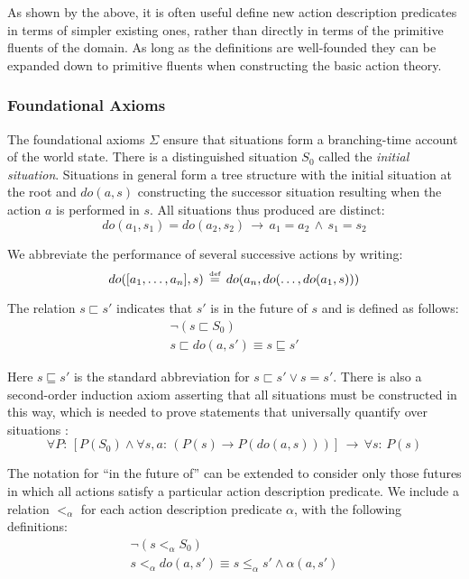 As shown by the above, it is often useful define new action description
predicates in terms of simpler existing ones, rather than directly
in terms of the primitive fluents of the domain. As long as the definitions
are well-founded they can be expanded down to primitive fluents when
constructing the basic action theory.


\subsubsection{Foundational Axioms}

The foundational axioms $\Sigma$ ensure that situations form a branching-time
account of the world state. There is a distinguished situation $S_{0}$
called the \emph{initial situation}. Situations in general form a
tree structure with the initial situation at the root and $do(a,s)$
constructing the successor situation resulting when the action $a$
is performed in $s$. All situations thus produced are distinct:\[
do(a_{1},s_{1})=do(a_{2},s_{2})\,\rightarrow\, a_{1}=a_{2}\,\wedge\, s_{1}=s_{2}\]


We abbreviate the performance of several successive actions by writing:\[
do([a_{1},\dots,a_{n}],s)\,\stackrel{\mbox{\tiny def}}{=}\, do(a_{n},do(\dots,do(a_{1},s)))\]


The relation $s\sqsubset s'$ indicates that $s'$ is in the future
of $s$ and is defined as follows:\begin{gather*}
\neg(s\sqsubset S_{0})\\
s\sqsubset do(a,s')\equiv s\sqsubseteq s'\end{gather*}


Here $s\sqsubseteq s'$ is the standard abbreviation for $s\sqsubset s'\vee s=s'$.
There is also a second-order induction axiom asserting that all situations
must be constructed in this way, which is needed to prove statements
that universally quantify over situations \citep{Reiter93proving}:\[
\forall P:\,\left[P(S_{0})\wedge\forall s,a:\,\left(P(s)\rightarrow P(do(a,s))\right)\right]\,\rightarrow\,\forall s:\, P(s)\]


The notation for {}``in the future of'' can be extended to consider
only those futures in which all actions satisfy a particular action
description predicate. We include a relation $<_{\alpha}$ for each
action description predicate $\alpha$, with the following definitions:\begin{gather*}
\neg\left(s<_{\alpha}S_{0}\right)\\
s<_{\alpha}do(a,s')\equiv s\leq_{\alpha}s'\wedge\alpha(a,s')\end{gather*}


